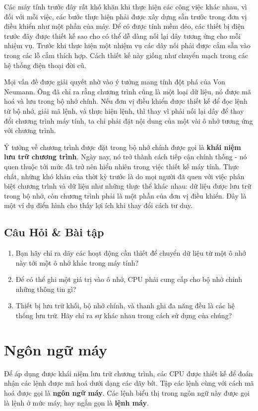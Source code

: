 Các máy tính trước đây rất khó khăn khi thực hiện các công việc khác nhau, vì đối với mỗi
việc, các bước thực hiện phải được xây dựng sẵn trước trong đơn vị điều khiển như một phần
của máy. Để có được tính mềm dẻo, các thiết bị điện trước đây được thiết kế sao cho có thể
dễ dàng nối lại dây tương ứng cho mỗi nhiệm vụ. Trước khi thực hiện một nhiệm vụ các dây
nối phải được cắm sẵn vào trong các lỗ cắm thích hợp. Cách thiết kế này giống như chuyển
mạch trong các hệ thống điện thoại đời cũ.

Mọi vấn đề được giải quyết nhờ vào ý tưởng mang tính đột phá của Von Neumann. Ông đã chỉ
ra rằng chương trình cũng là một loại dữ liệu, nó được mã hoá và lưu trong bộ nhớ
chính. Nếu đơn vị điều khiển được thiết kế để đọc lệnh từ bộ nhớ, giải mã lệnh, và thực
hiện lệnh, thì thay vì phải nối lại dây để thay đổi chương trình máy tính, ta chỉ phải đặt
nội dung của một vài ô nhớ tương ứng với chương trình.

Ý tưởng về chương trình được đặt trong bộ nhớ chính được gọi là \textbf{khái niệm lưu trữ
  chương trình}. Ngày nay, nó trở thành cách tiếp cận chính thống - nó quen thuộc tới mức
đã trở nên hiển nhiên trong việc thiết kế máy tính. Thực chất, những khó khăn của thời kỳ
trước là do mọi người đã quen với việc phân biệt chương trình và dữ liệu như những thực
thể khác nhau: dữ liệu được lưu trữ trong bộ nhớ, còn chương trình phải là một phần của
đơn vị điều khiển. Đây là một ví dụ điển hình cho thấy lợi ích khi thay đổi cách tư duy.

\subsection*{Câu Hỏi \& Bài tập}

\begin{enumerate}
\item Bạn hãy chỉ ra dãy các hoạt động cần thiết để chuyển dữ liệu từ một ô nhớ này tới
  một ô nhớ khác trong máy tính?

\item Để có thể ghi một giá trị vào ô nhớ, CPU phải cung cấp cho bộ nhớ chính những thông
  tin gì?

\item Thiết bị lưu trữ khối, bộ nhớ chính, và thanh ghi đa năng đều là các hệ thống lưu
  trữ. Hãy chỉ ra sự khác nhau trong cách sử dụng của chúng?

\end{enumerate}

\section{Ngôn ngữ máy}
Để áp dụng được khái niệm lưu trữ chương trình, các CPU được thiết kế để đoán nhận các
lệnh được mã hoá dưới dạng các dãy bít. Tập các lệnh cùng với cách mã hoá được gọi là
\textbf{ngôn ngữ máy}. Các lệnh biểu thị trong ngôn ngữ này được gọi là lệnh ở mức máy,
hay ngắn gọn là \textbf{lệnh máy}.

